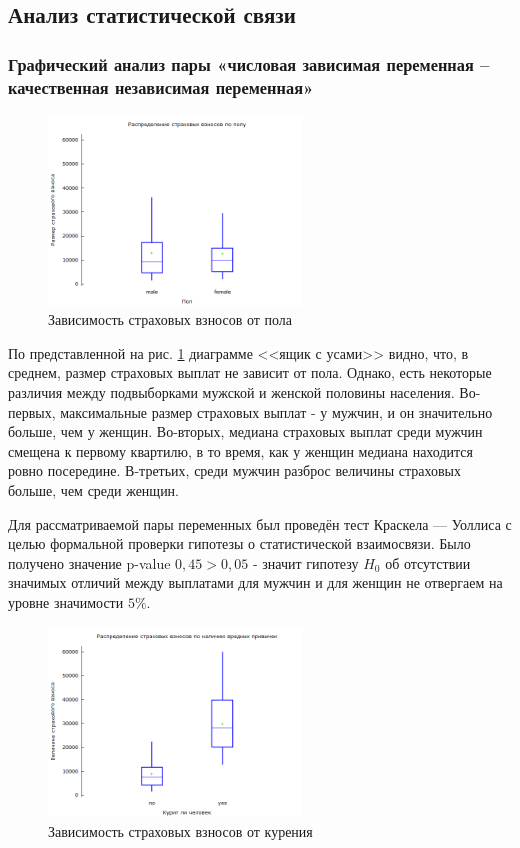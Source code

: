 \documentclass[a4paper,12pt]{article}
\begin{document}
\subsection{Анализ статистической связи}

\subsubsection{Графический анализ пары «числовая зависимая переменная – качественная независимая переменная»}

\begin{figure}[H]
	\includegraphics[width=0.6\textwidth]{../[graphics]/charges-sex.png}
	\centering
	\caption{Зависимость страховых взносов от пола}
	\label{fig:charges-sex}
\end{figure}

По представленной на рис. \ref{fig:charges-sex} диаграмме <<ящик с усами>> видно, что, в среднем, размер страховых выплат не зависит от пола. Однако, есть некоторые различия между подвыборками мужской и женской половины населения. Во-первых, максимальные размер страховых выплат - у мужчин, и он значительно больше, чем у женщин. Во-вторых, медиана страховых выплат среди мужчин смещена к первому квартилю, в то время, как у женщин медиана находится ровно посередине. В-третьих, среди мужчин разброс величины страховых больше, чем среди женщин.

Для рассматриваемой пары переменных был проведён тест Краскела — Уоллиса с целью формальной проверки гипотезы о статистической взаимосвязи. Было получено значение p-value $0,45 > 0,05$ - значит гипотезу $H_0$ об отсутствии значимых отличий между выплатами для мужчин и для женщин не отвергаем на уровне значимости $5\%$.

\begin{figure}[H]
	\includegraphics[width=0.6\textwidth]{../[graphics]/charges-smoker.png}
	\centering
	\caption{Зависимость страховых взносов от курения}
	\label{fig:charges-smoker}
\end{figure}
\end{document}
